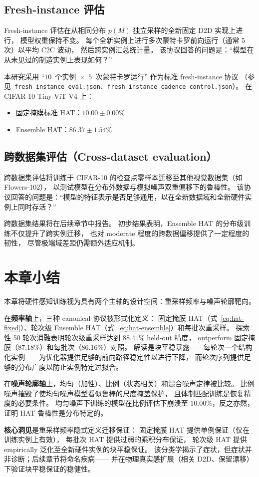 \subsection{Fresh-instance 评估}

Fresh-instance 评估在从相同分布 $p(M)$ 独立采样的全新固定 D2D 实现上进行，
模型权重保持不变。
每个全新实例上进行多次蒙特卡罗前向运行（通常 5 次）以平均 C2C 波动，
然后跨实例汇总统计量。
该协议回答的问题是：``模型在从未见过的制造实例上表现如何？''

本研究采用 ``$10$~个实例~$\times$~$5$~次蒙特卡罗运行'' 作为标准 fresh-instance 协议
（参见~\texttt{fresh\_instance\_eval.json}、\texttt{fresh\_instance\_cadence\_control.json}）。
在 CIFAR-10 Tiny-ViT V4 上：
\begin{itemize}
    \item 固定掩膜标准 HAT：$10.00\pm0.00\%$
    \item Ensemble HAT：$86.37\pm1.54\%$
\end{itemize}

\subsection{跨数据集评估（Cross-dataset evaluation）}

跨数据集评估将训练于 CIFAR-10 的检查点零样本迁移至其他视觉数据集（如 Flowers-102），
以测试模型在分布外数据与模拟噪声双重偏移下的鲁棒性。
该协议回答的问题是：``模型的特征表示是否足够通用，以在全新数据域和全新硬件实例上同时存活？''

跨数据集结果将在后续章节中报告。
初步结果表明，Ensemble HAT 的分布级训练不仅提升了跨实例迁移，
也对 moderate 程度的跨数据偏移提供了一定程度的韧性，
尽管极端域差距仍需额外适应机制。

\section{本章小结}

本章将硬件感知训练视为具有两个主轴的设计空间：重采样频率与噪声轮廓靶向。

在\textbf{频率轴}上，三种 canonical 协议被形式化定义：
固定掩膜 HAT（式~\ref{eq:hat-fixed}）、轮次级 Ensemble HAT（式~\ref{eq:hat-ensemble}）和每批次重采样。
探索性 50 轮次消融表明轮次级重采样达到 $88.41\%$ held-out 精度，
outperform 固定掩膜（$87.18\%$）和每批次（$86.16\%$）对照。
解读是块平稳暴露——每轮次一个结构化实例——为优化器提供足够的前向路径稳定性以进行下降，
而轮次序列提供足够的分布广度以防止实例特定过拟合。

在\textbf{噪声轮廓轴}上，均匀（加性）、比例（状态相关）和混合噪声定律被比较。
比例噪声摧毁了使均匀噪声模型看似鲁棒的尺度掩盖保护，
且体制匹配训练是恢复精度的必要条件。
均匀噪声下训练的模型在比例评估下崩溃至 $10.00\%$，反之亦然，
证明 HAT 鲁棒性是分布特定的。

\textbf{核心洞见}是重采样频率隐式定义迁移保证：
固定掩膜 HAT 提供单例保证（仅在训练实例上有效），
每批次 HAT 提供过弱的乘积分布保证，
轮次级 HAT 提供 empirically 泛化至全新硬件实例的块平稳保证。
该分类学揭示了症状，但症状并非诊断；后续章节将命名疾病——
并在物理真实感扩展（相关 D2D、保留漂移）下验证块平稳保证的稳健性。
